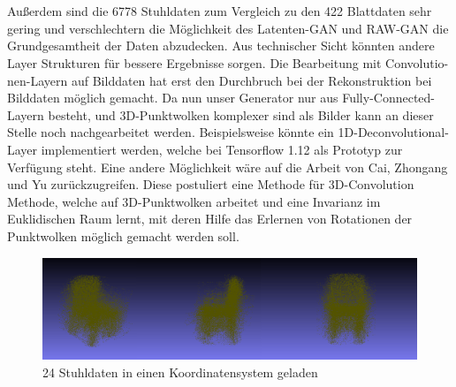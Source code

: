 \documentclass{llncs}
\begin{document}
\\\\ 
Außerdem sind die 6778 Stuhldaten zum Vergleich zu den 422 Blattdaten sehr gering und verschlechtern die Möglichkeit des Latenten-GAN und RAW-GAN die Grundgesamtheit der Daten abzudecken. Aus technischer Sicht könnten andere Layer Strukturen für bessere Ergebnisse sorgen. Die Bearbeitung mit Convolutio-nen-Layern auf Bilddaten hat erst den  Durchbruch bei der Rekonstruktion bei Bilddaten möglich gemacht\cite{imagerecon}. Da nun unser Generator nur aus Fully-Connected-Layern besteht, und 3D-Punktwolken komplexer sind als Bilder kann an dieser Stelle noch nachgearbeitet werden. Beispielsweise könnte ein 1D-Deconvolutional-Layer implementiert werden, welche bei Tensorflow 1.12 als Prototyp zur Verfügung steht. Eine andere Möglichkeit wäre auf die Arbeit von Cai, Zhongang  und Yu \cite{3d-conv} zurückzugreifen. Diese postuliert eine Methode für 3D-Convolution Methode, welche auf 3D-Punktwolken arbeitet und eine Invarianz im Euklidischen Raum lernt, mit deren Hilfe das Erlernen von Rotationen der Punktwolken möglich gemacht werden soll.
\begin{figure}[htbp] 
	\centering
	\includegraphics[width=1.0\textwidth]{chair_all.png}
	\caption{24 Stuhldaten in einen Koordinatensystem geladen}
	\label{fig:Bild85}
\end{figure}
\newpage
\end{document}
